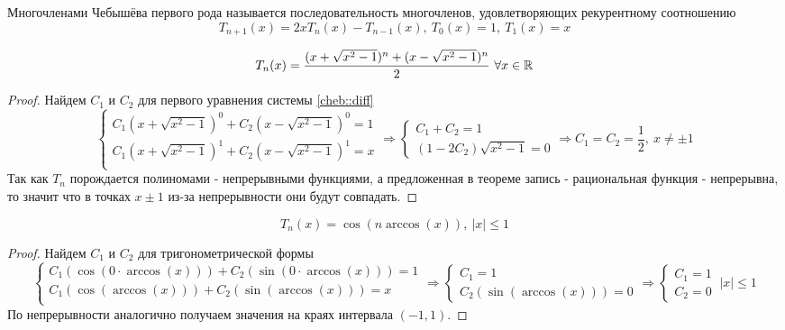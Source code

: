 \begin{definition}
  Многочленами Чебышёва первого рода называется последовательность
  многочленов, удовлетворяющих рекурентному соотношению
  \[T_{n+1}(x)=2xT_n(x)-T_{n-1}(x),\ T_0(x)=1,\ T_1(x)=x\]
\end{definition}
\begin{theorem}
  \[T_n(x)=\frac{(x+\sqrt{x^2-1})^n+(x-\sqrt{x^2-1})^n}{2}\ \forall x\in\R\]
\end{theorem}
\begin{proof}
  Найдем $C_1$ и $C_2$ для первого уравнения системы \eqref{cheb::diff}
  \[\begin{cases}
      C_1(x+\sqrt{x^2-1})^0+C_2(x-\sqrt{x^2-1})^0=1 \\
      C_1(x+\sqrt{x^2-1})^1+C_2(x-\sqrt{x^2-1})^1=x \\
    \end{cases}\Rightarrow\begin{cases}
      C_1+C_2=1 \\
      (1-2C_2)\sqrt{x^2-1}=0
    \end{cases}\Rightarrow C_1=C_2=\frac{1}{2},\ x\neq\pm1\]
  Так как $T_n$ порождается полиномами - непрерывными функциями,
  а предложенная в теореме запись - рациональная функция - непрерывна,
  то значит что в точках $x\pm1$ из-за непрерывности они будут совпадать.
\end{proof}
\begin{theorem}
  \[T_n(x)=\cos(n\arccos(x)),\ |x|\leq1\]
\end{theorem}
\begin{proof}
  Найдем $C_1$ и $C_2$ для тригонометрической формы
  \[\begin{cases}
      C_1(\cos(0\cdot\arccos(x)))+C_2(\sin(0\cdot\arccos(x)))=1 \\
      C_1(\cos(\arccos(x)))+C_2(\sin(\arccos(x)))=x             \\
    \end{cases}\Rightarrow\begin{cases}
      C_1=1 \\
      C_2(\sin(\arccos(x)))=0
    \end{cases}\Rightarrow\begin{cases}
      C_1=1 \\
      C_2=0
    \end{cases}\ |x|\leq1\]
  По непрерывности аналогично получаем значения на краях интервала $(-1,1)$.
\end{proof}

